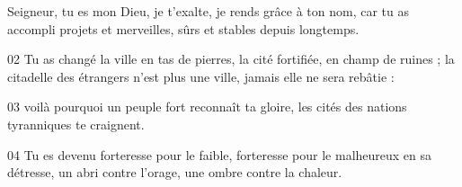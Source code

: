 Seigneur, tu es mon Dieu, je t’exalte, je rends grâce à ton nom, car tu as accompli projets et merveilles, sûrs et stables depuis longtemps.

02 Tu as changé la ville en tas de pierres, la cité fortifiée, en champ de ruines ; la citadelle des étrangers n’est plus une ville, jamais elle ne sera rebâtie :

03 voilà pourquoi un peuple fort reconnaît ta gloire, les cités des nations tyranniques te craignent.

04 Tu es devenu forteresse pour le faible, forteresse pour le malheureux en sa détresse, un abri contre l’orage, une ombre contre la chaleur. 